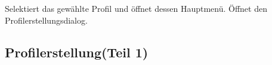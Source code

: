 \begin{center}
\setlength\fboxsep{20pt}
\setlength\fboxrule{1pt}
\end{center}

\begin{requirements}
 Selektiert das gewählte Profil und öffnet dessen Hauptmenü.
 Öffnet den Profilerstellungsdialog.
\end{requirements}

\subsection{Profilerstellung(Teil 1)}

\begin{center}
\setlength\fboxsep{20pt}
\setlength\fboxrule{1pt}
\end{center}

